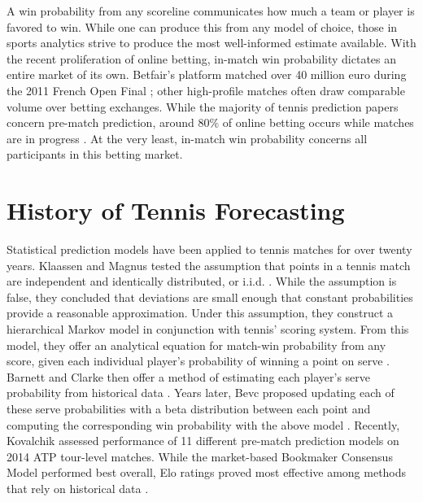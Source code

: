 \documentclass[chapterprefix=false]{report}
\begin{document}

A win probability from any scoreline communicates how much a team or player is favored to win. While one can produce this from any model of choice, those in sports analytics strive to produce the most well-informed estimate available.  With the recent proliferation of online betting, in-match win probability dictates an entire market of its own. Betfair's platform  matched over 40 million euro during the 2011 French Open Final \citep{Huang2011}; other high-profile matches often draw comparable volume over betting exchanges. While the majority of tennis prediction papers concern pre-match prediction, around 80$\%$ of online betting occurs while matches are in progress \citep{Sipko2015}. At the very least, in-match win probability concerns all participants in this betting market.




\section{History of Tennis Forecasting}

Statistical prediction models have been applied to tennis matches for over twenty years. Klaassen and Magnus tested the assumption that points in a tennis match are independent and identically distributed, or i.i.d. \citep{KlaassenandMagnus2001}. While the assumption is false, they concluded that deviations are small enough that constant probabilities provide a reasonable approximation. Under this assumption, they construct a hierarchical Markov model in conjunction with tennis' scoring system. From this model, they offer an analytical equation for match-win probability from any score, given each individual player's probability of winning a point on serve \citep{Klaassen2003}.  Barnett and Clarke then offer a method of estimating each player's serve probability from historical data \citep{BarnettandClarke2005}. Years later, Bevc proposed updating each of these serve probabilities with a beta distribution between each point and computing the corresponding win probability with the above model \citep{Bevc2015}. Recently, Kovalchik assessed performance of 11 different pre-match prediction models on 2014 ATP tour-level matches. While the market-based Bookmaker Consensus Model performed best overall, Elo ratings proved most effective among methods that rely on historical data \citep{Kovalchik2016}.
\end{document}

